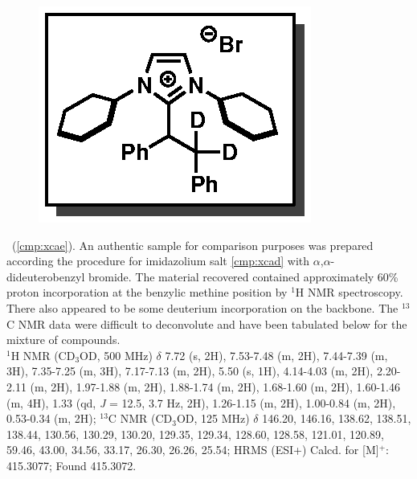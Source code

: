 \vspace{10pt}
\begin{figure}
  \vspace{-25pt}
  \begin{center}
    \includegraphics[scale=0.8]{chp_alkylation/images/xcae}
  \end{center}
  \vspace{-30pt}
\end{figure}
\noindent \textbf{\CMPxcae}\ (\ref{cmp:xcae}). An authentic sample for comparison purposes was
prepared according the procedure for imidazolium salt \ref{cmp:xcad} with
$\alpha$,$\alpha$-dideuterobenzyl bromide.
The material recovered contained approximately 60\% proton incorporation at the benzylic methine
position by $^1$H NMR spectroscopy. There also appeared to be some deuterium incorporation on the
backbone. The $^{13}$C NMR data were difficult to deconvolute and have been tabulated below for the
mixture of compounds.
\\
$^1$H NMR (CD$_3$OD, 500 MHz) $\delta$ 7.72 (s, 2H), 7.53-7.48 (m, 2H), 7.44-7.39 (m, 3H),
7.35-7.25 (m, 3H), 7.17-7.13 (m, 2H), 5.50 (s, 1H), 4.14-4.03 (m, 2H), 2.20-2.11 (m, 2H), 1.97-1.88
(m, 2H), 1.88-1.74 (m, 2H), 1.68-1.60 (m, 2H), 1.60-1.46 (m, 4H), 1.33 (qd, \textit{J} = 12.5, 3.7 Hz, 2H), 1.26-1.15 (m, 2H), 1.00-0.84 (m, 2H), 0.53-0.34 (m, 2H); $^{13}$C NMR
(CD$_3$OD, 125 MHz) $\delta$ 146.20, 146.16, 138.62, 138.51, 138.44, 130.56, 130.29, 130.20,
129.35, 129.34, 128.60, 128.58, 121.01, 120.89, 59.46, 43.00, 34.56, 33.17, 26.30, 26.26, 25.54;
HRMS (ESI+) Calcd.
for  [M]$^+$:
415.3077; Found 415.3072.

